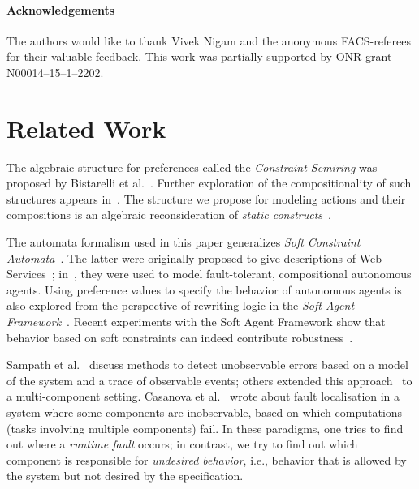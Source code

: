 \documentclass[a4paper]{article}
\theoremstyle{definition}
\begin{document}
\paragraph{Acknowledgements}
The authors would like to thank Vivek Nigam and the anonymous FACS-referees for their valuable feedback. This work was partially supported by  ONR grant N00014--15--1--2202.

\section{Related Work}%
\label{section:related-work}

The algebraic structure for preferences called the \emph{Constraint Semiring} was proposed by Bistarelli et al.~\cite{bistarelli-montanari-rossi-1995,bistarelli-2004}. Further exploration of the compositionality of such structures appears in~\cite{gadducci-holzl-monreale-wirsing-2013,holzl-meier-wirsing-2009,kappe-arbab-talcott-2016}. The structure we propose for modeling actions and their compositions is an algebraic reconsideration of \emph{static constructs}~\cite{huttel-larsen-1989}.

The automata formalism used in this paper generalizes \emph{Soft Constraint Automata}~\cite{baier-sirjani-arbab-rutten-2006,arbab-santini-2013}. The latter were originally proposed to give descriptions of Web Services~\cite{arbab-santini-2013}; in~\cite{kappe-arbab-talcott-2016}, they were used to model fault-tolerant, compositional autonomous agents. Using preference values to specify the behavior of autonomous agents is also explored from the perspective of rewriting logic in the \emph{Soft Agent Framework}~\cite{talcott-arbab-yadav-2015,talcott-nigam-arbab-kappe-2016}. Recent experiments with the Soft Agent Framework show that behavior based on soft constraints can indeed contribute robustness~\cite{mason-nigam-talcott-brito-2017}.

Sampath et al.~\cite{sampath-sengupta-lafortune-sinnamohideen-teneketzis-1996} discuss methods to detect unobservable errors based on a model of the system and a trace of observable events; others extended this approach~\cite{debouk-lafortune-teneketzis-2000,neidig-lunze-2005} to a multi-component setting. Casanova et al.~\cite{casanova-garlan-schmerl-abreu-2014} wrote about fault localisation in a system where some components are inobservable, based on which computations (tasks involving multiple components) fail. In these paradigms, one tries to find out where a \emph{runtime fault} occurs; in contrast, we try to find out which component is responsible for \emph{undesired behavior}, i.e., behavior that is allowed by the system but not desired by the specification.
\end{document}

